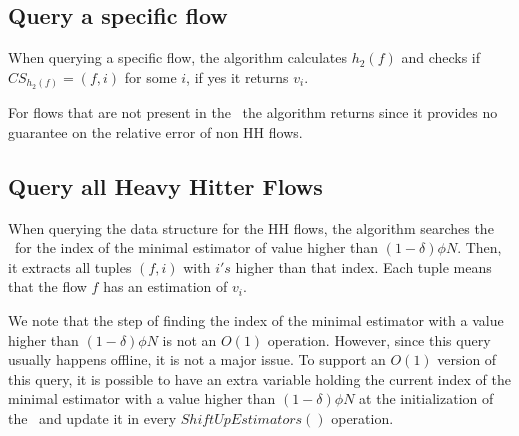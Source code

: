 
\subsection{Query a specific flow}
When querying a specific flow, the algorithm calculates $h_2(f)$ and checks if $CS_{h_2(f)}=(f,i)$ for some $i$, if yes it returns $v_i$.

For flows that are not present in the \cs\ the algorithm returns  since it provides no guarantee on the relative error of non HH flows.

\subsection{Query all Heavy Hitter Flows}
When querying the data structure for the HH flows, the algorithm searches the \sea\ for the index of the minimal estimator of value higher than $(1-\delta) \phi N$. Then, it extracts all tuples $(f, i)$ with $i's$ higher than that index. Each tuple means that the flow $f$ has an estimation of $v_i$.

We note that the step of finding the index of the minimal estimator with a value higher than $(1-\delta) \phi N$ is not an $O(1)$ operation. However, since this query usually happens offline, it is not a major issue. To support an $O(1)$ version of this query, it is possible to have an extra variable holding the current index of the minimal estimator with a value higher than $(1-\delta) \phi N$ at the initialization of the \sea\ and update it in every $ShiftUpEstimators()$ operation.

